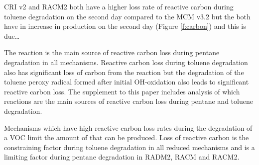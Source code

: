 CRI v2 and RACM2 both have a higher loss rate of reactive carbon during toluene degradation on the second day compared to the MCM v3.2 but the both have in increase in  production on the second day (Figure \ref{f:carbon}) and this is due\ldots

The  reaction is the main source of reactive carbon loss during pentane degradation in all mechanisms.
Reactive carbon loss during toluene degradation also has significant loss of carbon from the  reaction but the degradation of the toluene peroxy radical formed after initial OH-oxidation also leads to significant reactive carbon loss.
The supplement to this paper includes analysis of which reactions are the main sources of reactive carbon loss during pentane and toluene degradation.

Mechanisms which have high reactive carbon loss rates during the degradation of a VOC limit the amount of  that can be produced.
Loss of reactive carbon is the constraining factor during toluene degradation in all reduced mechanisms and is a limiting factor during pentane degradation in RADM2, RACM and RACM2.
